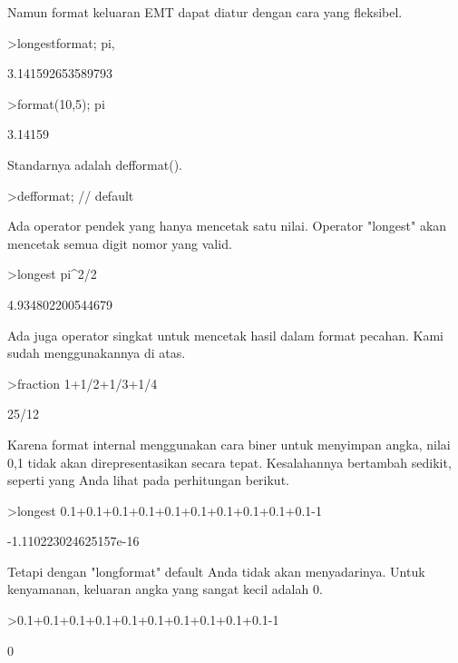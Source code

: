 \begin{eulernotebook}
\begin{eulercomment}
Namun format keluaran EMT dapat diatur dengan cara yang fleksibel.
\end{eulercomment}
\begin{eulerprompt}
>longestformat; pi,
\end{eulerprompt}
\begin{euleroutput}
  3.141592653589793
\end{euleroutput}
\begin{eulerprompt}
>format(10,5); pi
\end{eulerprompt}
\begin{euleroutput}
    3.14159 
\end{euleroutput}
\begin{eulercomment}
Standarnya adalah defformat().
\end{eulercomment}
\begin{eulerprompt}
>defformat; // default
\end{eulerprompt}
\begin{eulercomment}
Ada operator pendek yang hanya mencetak satu nilai. Operator "longest"
akan mencetak semua digit nomor yang valid.
\end{eulercomment}
\begin{eulerprompt}
>longest pi^2/2
\end{eulerprompt}
\begin{euleroutput}
        4.934802200544679 
\end{euleroutput}
\begin{eulercomment}
Ada juga operator singkat untuk mencetak hasil dalam format pecahan.
Kami sudah menggunakannya di atas.
\end{eulercomment}
\begin{eulerprompt}
>fraction 1+1/2+1/3+1/4
\end{eulerprompt}
\begin{euleroutput}
  25/12
\end{euleroutput}
\begin{eulercomment}
Karena format internal menggunakan cara biner untuk menyimpan angka,
nilai 0,1 tidak akan direpresentasikan secara tepat. Kesalahannya
bertambah sedikit, seperti yang Anda lihat pada perhitungan berikut.
\end{eulercomment}
\begin{eulerprompt}
>longest 0.1+0.1+0.1+0.1+0.1+0.1+0.1+0.1+0.1+0.1-1
\end{eulerprompt}
\begin{euleroutput}
   -1.110223024625157e-16 
\end{euleroutput}
\begin{eulercomment}
Tetapi dengan "longformat" default Anda tidak akan menyadarinya. Untuk
kenyamanan, keluaran angka yang sangat kecil adalah 0.
\end{eulercomment}
\begin{eulerprompt}
>0.1+0.1+0.1+0.1+0.1+0.1+0.1+0.1+0.1+0.1-1
\end{eulerprompt}
\begin{euleroutput}
  0\\
  

\end{euleroutput}
\end{eulernotebook}
